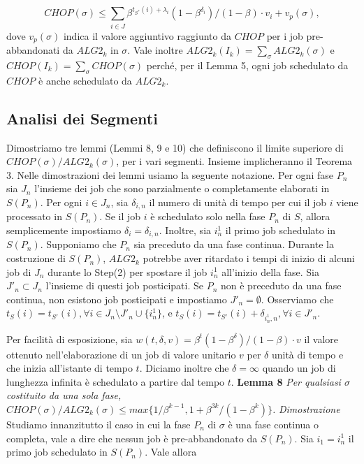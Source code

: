 \documentclass[12pt]{article}
\begin{document}
$$CHOP(\sigma) \leq \sum_{i \in J} \beta^{t_{S^{*}}(i)+\lambda_{i}} (1 - \beta^{\delta_{i}})/(1 - \beta) \cdot v_{i} + v_{p}(\sigma),$$
dove $v_{p}(\sigma)$ indica il valore aggiuntivo raggiunto da $CHOP$ per i job pre-abbandonati da $ALG2_{k}$ in $\sigma$. Vale inoltre $ALG2_{k}(I_{k}) = \sum_{\sigma} ALG2_{k}(\sigma)$ e $CHOP(I_{k}) =\sum_{\sigma}CHOP(\sigma)$ perché, per il Lemma 5, ogni job schedulato da $CHOP$ è anche schedulato da $ALG2_{k}$.

\subsection{Analisi dei Segmenti}
Dimostriamo tre lemmi (Lemmi 8, 9 e 10) che definiscono il limite superiore di $CHOP(\sigma)/ALG2_{k}(\sigma)$, per i vari segmenti. Insieme implicheranno il Teorema 3. Nelle dimostrazioni dei lemmi usiamo la seguente notazione. Per ogni fase $P_{n}$ sia $J_{n}$ l'insieme dei job che sono parzialmente o completamente elaborati in $S(P_{n})$. Per ogni $i \in J_{n}$, sia $\delta_{i,n}$ il numero di unità di tempo per cui il job $i$ viene processato in $S(P_{n})$. Se il job $i$ è schedulato solo nella fase $P_{n}$ di $S$, allora semplicemente impostiamo $\delta_{i} = \delta_{i,n}$. Inoltre, sia $i^{1}_{n}$ il primo job schedulato in $S(P_{n})$. Supponiamo che $P_{n}$ sia preceduto da una fase continua. Durante la costruzione di $S(P_{n})$, $ALG2_{k}$ potrebbe aver ritardato i tempi di inizio di alcuni job di $J_{n}$ durante lo Step(2) per spostare il job $i^{1}_{n}$ all'inizio della fase. Sia $J'_{n} \subset J_{n}$ l'insieme di questi job posticipati. Se $P_{n}$ non è preceduto da una fase continua, non esistono job posticipati e impostiamo $J'_{n} = \emptyset$. Osserviamo che $t_{S}(i) = t_{S'}(i), \forall i \in J_{n} \setminus J'_{n} \cup \{i^{1}_{n}\}$, e $t_{S}(i) = t_{S'}(i) + \delta_{i^{1}_{n},n}, \forall i \in J'_{n}$.

Per facilità di esposizione, sia $w(t, \delta, v) = \beta^{t} (1 - \beta^{\delta}) / (1 - \beta) \cdot v$ il valore ottenuto nell'elaborazione di un job di valore unitario $v$ per $\delta$ unità di tempo e che inizia all'istante di tempo $t$. Diciamo inoltre che $\delta = \infty$ quando un job di lunghezza infinita è schedulato a partire dal tempo $t$.
\newline \newline
\textbf{Lemma 8}
\textit{Per qualsiasi $\sigma$ costituito da una sola fase, $CHOP(\sigma) / ALG2_{k}(\sigma) \leq max \{1 / \beta^{k - 1}, 1 + \beta^{3k} / (1 - \beta^{k})\}$.}
\newline \newline
\textit{Dimostrazione} 
Studiamo innanzitutto il caso in cui la fase $P_{n}$ di $\sigma$ è una fase continua o completa, vale a dire che nessun job è pre-abbandonato da $S(P_{n})$. Sia $i_{1} = i^{1}_{n}$ il primo job schedulato in $S(P_{n})$. Vale allora
\end{document}
